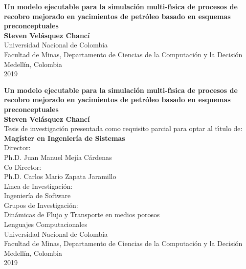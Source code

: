 \begin{center}
\begin{figure}
\centering%
%
\end{figure}
\thispagestyle{empty} \vspace*{1.0cm} \textbf{\LARGE
Un modelo ejecutable para la simulación multi-f\'{\i}sica de procesos de recobro mejorado en yacimientos de petr\'{o}leo basado en esquemas preconceptuales}\\[5.5cm]
\Large\textbf{Steven Velásquez Chancí}\\[5.5cm]
\small Universidad Nacional de Colombia\\
Facultad de Minas, Departamento de Ciencias de la Computación y la Decisión\\
Medellín, Colombia\\
2019\\
\end{center}

\newpage
\begin{center}
\thispagestyle{empty} \vspace*{0cm} \textbf{\LARGE
Un modelo ejecutable para la simulación multi-f\'{\i}sica de procesos de recobro mejorado en yacimientos de petr\'{o}leo basado en esquemas preconceptuales}\\[2.0cm]
\Large\textbf{Steven Velásquez Chancí}\\[2.0cm]
\small Tesis de investigación presentada como requisito parcial para optar al
t\'{\i}tulo de:\\
\textbf{Magíster en Ingeniería de Sistemas}\\[2.0cm]
Director:\\
Ph.D. Juan Manuel Mejía Cárdenas\\
Co-Director:\\
Ph.D. Carlos Mario Zapata Jaramillo\\[2.0cm]
L\'{\i}nea de Investigaci\'{o}n:\\
Ingeniería de Software\\
Grupos de Investigaci\'{o}n:\\
Dinámicas de Flujo y Transporte en medios porosos\\
Lenguajes Computacionales\\[2.0cm]
Universidad Nacional de Colombia\\
Facultad de Minas, Departamento de Ciencias de la Computación y la Decisión\\
Medellín, Colombia\\
2019\\
\end{center}

